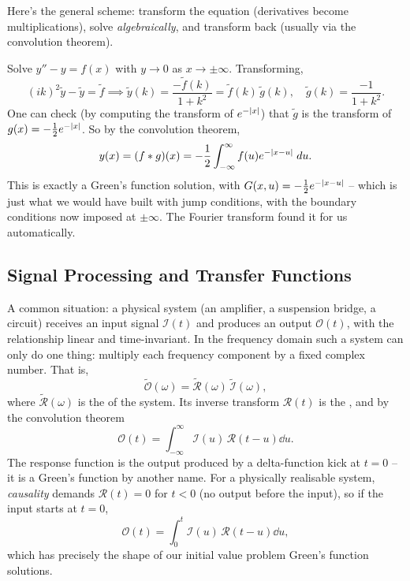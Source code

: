 \documentclass[a4paper]{scrartcl}
\begin{document}
Here's the general scheme: transform the equation (derivatives become multiplications), solve \emph{algebraically}, and transform back (usually via the convolution theorem).

\begin{example}
    Solve $y'' - y = f(x)$ with $y \to 0$ as $x \to \pm\infty$. Transforming,
    $$
    (ik)^2 \tilde{y} - \tilde{y} = \tilde{f} \implies \tilde{y}(k) = \frac{-\tilde{f}(k)}{1 + k^2} = \tilde{f}(k)\, \tilde{g}(k), \quad \tilde{g}(k) = \frac{-1}{1 + k^2}.
    $$
    One can check (by computing the transform of $e^{-\lvert x\rvert}$) that $\tilde{g}$ is the transform of $g(x) = -\frac{1}{2}e^{-\lvert x\rvert}$. So by the convolution theorem,
    $$
    y(x) = (f * g)(x) = -\frac{1}{2}\int_{-\infty}^{\infty} f(u) e^{-\lvert x - u\rvert} \; d u.
    $$
    This is exactly a Green's function solution, with $G(x, u) = -\frac{1}{2}e^{-\lvert x - u\rvert}$ -- which is just what we would have built with jump conditions, with the boundary conditions now imposed at $\pm \infty$. The Fourier transform found it for us automatically.
\end{example}

\subsection{Signal Processing and Transfer Functions}

A common situation: a physical system (an amplifier, a suspension bridge, a circuit) receives an input signal $\mathcal{I}(t)$ and produces an output $\mathcal{O}(t)$, with the relationship linear and time-invariant. In the frequency domain such a system can only do one thing: multiply each frequency component by a fixed complex number. That is,
$$
\tilde{\mathcal{O}}(\omega) = \tilde{\mathcal{R}}(\omega)\, \tilde{\mathcal{I}}(\omega),
$$
where $\tilde{\mathcal{R}}(\omega)$ is the  of the system. Its inverse transform $\mathcal{R}(t)$ is the , and by the convolution theorem
$$
\mathcal{O}(t) = \int_{-\infty}^{\infty} \mathcal{I}(u)\, \mathcal{R}(t - u) \dd u.
$$
The response function is the output produced by a delta-function kick at $t = 0$ -- it is a Green's function by another name. For a physically realisable system, \emph{causality} demands $\mathcal{R}(t) = 0$ for $t < 0$ (no output before the input), so if the input starts at $t = 0$,
$$
\mathcal{O}(t) = \int_0^t \mathcal{I}(u)\, \mathcal{R}(t - u) \dd u,
$$
which has precisely the shape of our initial value problem Green's function solutions.
\end{document}
